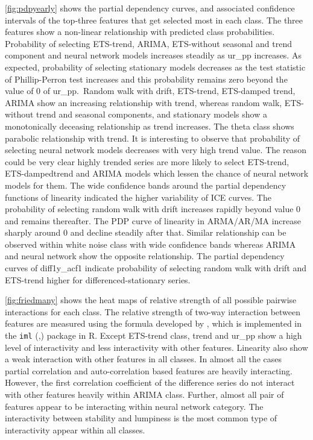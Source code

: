 \documentclass[11pt,a4paper,]{article}
\begin{document}
\autoref{fig:pdpyearly} shows the partial dependency curves, and
associated confidence intervals of the top-three features that get
selected most in each class. The three features show a non-linear
relationship with predicted class probabilities. Probability of
selecting ETS-trend, ARIMA, ETS-without seasonal and trend component and
neural network models increases steadily as ur\_pp increases. As
expected, probability of selecting stationary models decreases as the
test statistic of Phillip-Perron test increases and this probability
remains zero beyond the value of 0 of ur\_pp.~Random walk with drift,
ETS-trend, ETS-damped trend, ARIMA show an increasing relationship with
trend, whereas random walk, ETS-without trend and seasonal components,
and stationary models show a monotonically deceasing relationship as
trend increases. The theta class shows parabolic relationship with
trend. It is interesting to observe that probability of selecting neural
network models decreases with very high trend value. The reason could be
very clear highly trended series are more likely to select ETS-trend,
ETS-dampedtrend and ARIMA models which lessen the chance of neural
network models for them. The wide confidence bands around the partial
dependency functions of linearity indicated the higher variability of
ICE curves. The probability of selecting random walk with drift
increases rapidly beyond value 0 and remains thereafter. The PDP curve
of linearity in ARMA/AR/MA increase sharply around 0 and decline
steadily after that. Similar relationship can be observed within white
noise class with wide confidence bands whereas ARIMA and neural network
show the opposite relationship. The partial dependency curves of
diff1y\_acf1 indicate probability of selecting random walk with drift
and ETS-trend higher for differenced-stationary series.

\autoref{fig:friedmany} shows the heat maps of relative strength of all
possible pairwise interactions for each class. The relative strength of
two-way interaction between features are measured using the formula
developed by \textcite{friedman2008predictive}, which is implemented in
the \texttt{iml} (\textcite{molnar2018iml},) package in R. Except
ETS-trend class, trend and ur\_pp show a high level of interactivity and
less interactivity with other features. Linearity also show a weak
interaction with other features in all classes. In almost all the cases
partial correlation and auto-correlation based features are heavily
interacting. However, the first correlation coefficient of the
difference series do not interact with other features heavily within
ARIMA class. Further, almost all pair of features appear to be
interacting within neural network category. The interactivity between
stability and lumpiness is the most common type of interactivity appear
within all classes.
\end{document}
